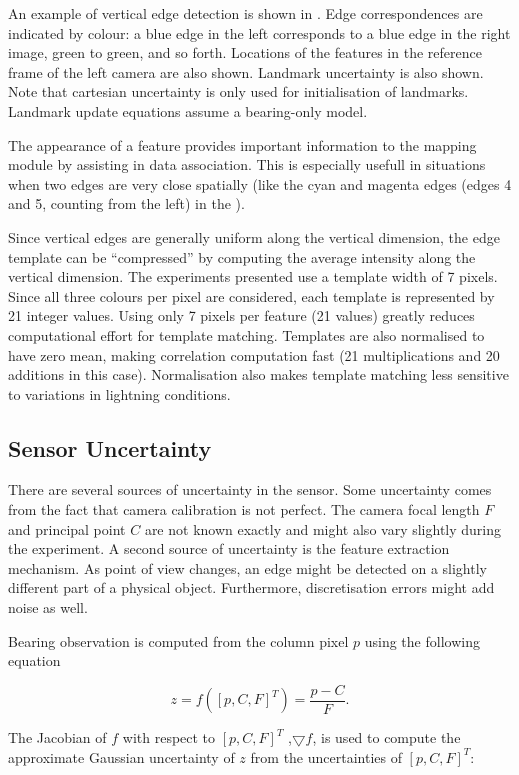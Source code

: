 An example of vertical edge detection is shown in
. Edge correspondences are
indicated by colour: a blue edge in the left corresponds to a blue
edge in the right image, green to green, and so forth. Locations of
the features in the reference frame of the left camera are also
shown. Landmark uncertainty is also shown. Note that cartesian
uncertainty is only used for initialisation of landmarks. Landmark
update equations assume a bearing-only model.

The appearance of a feature provides important information to the
mapping module by assisting in data association. This is especially
usefull in situations when two edges are very close spatially (like
the cyan and magenta edges (edges 4 and 5, counting from the left) in
the ).

Since vertical edges are generally uniform along the vertical
dimension, the edge template can be ``compressed'' by computing the
average intensity along the vertical dimension. The experiments
presented use a template width of 7 pixels. Since all three colours
per pixel are considered, each template is represented by 21 integer
values. Using only 7 pixels per feature (21 values) greatly reduces
computational effort for template matching. Templates are also
normalised to have zero mean, making correlation computation fast (21
multiplications and 20 additions in this case). Normalisation also
makes template matching less sensitive to variations in lightning
conditions.

\subsection{Sensor Uncertainty}

There are several sources of uncertainty in the sensor. Some
uncertainty comes from the fact that camera calibration is not
perfect. The camera focal length $F$ and principal point $C$ are not
known exactly and might also vary slightly during the experiment. A
second source of uncertainty is the feature extraction mechanism. As
point of view changes, an edge might be detected on a slightly
different part of a physical object. Furthermore, discretisation
errors might add noise as well.

Bearing observation is computed from the column pixel $p$ using the
following equation

$$
z = f([p,C,F]^T) = \frac{p - C}{F}.
$$

The Jacobian of $f$ with respect to $[p,C,F]^T$ ,$\bigtriangledown f$, is used to compute the
approximate Gaussian uncertainty of $z$ from the uncertainties of
$[p,C,F]^T$:

